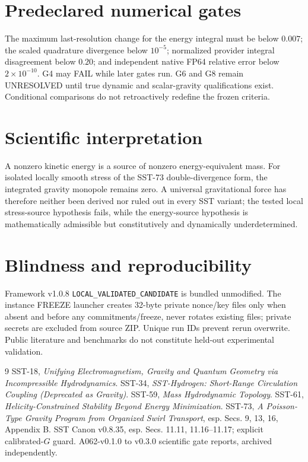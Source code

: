 \documentclass[10pt,a4paper]{article}
\begin{document}
\section{Predeclared numerical gates}
The maximum last-resolution change for the energy integral must be below $0.007$; the scaled quadrature divergence below $10^{-5}$; normalized provider integral disagreement below $0.20$; and independent native FP64 relative error below $2\times10^{-10}$. G4 may FAIL while later gates run. G6 and G8 remain UNRESOLVED until true dynamic and scalar-gravity qualifications exist. Conditional comparisons do not retroactively redefine the frozen criteria.
\section{Scientific interpretation}
A nonzero kinetic energy is a source of nonzero energy-equivalent mass. For isolated locally smooth stress of the SST-73 double-divergence form, the integrated gravity monopole remains zero. A universal gravitational force has therefore neither been derived nor ruled out in every SST variant; the tested local stress-source hypothesis fails, while the energy-source hypothesis is mathematically admissible but constitutively and dynamically underdetermined.
\section{Blindness and reproducibility}
Framework v1.0.8 \texttt{LOCAL\_VALIDATED\_CANDIDATE} is bundled unmodified. The instance FREEZE launcher creates 32-byte private nonce/key files only when absent and before any commitments/freeze, never rotates existing files; private secrets are excluded from source ZIP. Unique run IDs prevent rerun overwrite. Public literature and benchmarks do not constitute held-out experimental validation.
\begin{thebibliography}{9}
 SST-18, \emph{Unifying Electromagnetism, Gravity and Quantum Geometry via Incompressible Hydrodynamics}.
 SST-34, \emph{SST-Hydrogen: Short-Range Circulation Coupling (Deprecated as Gravity)}.
 SST-59, \emph{Mass Hydrodynamic Topology}.
 SST-61, \emph{Helicity-Constrained Stability Beyond Energy Minimization}.
 SST-73, \emph{A Poisson-Type Gravity Program from Organized Swirl Transport}, esp. Secs. 9, 13, 16, Appendix B.
 SST Canon v0.8.35, esp. Secs. 11.11, 11.16--11.17; explicit calibrated-$G$ guard.
 A062-v0.1.0 to v0.3.0 scientific gate reports, archived independently.
\end{thebibliography}
\end{document}
